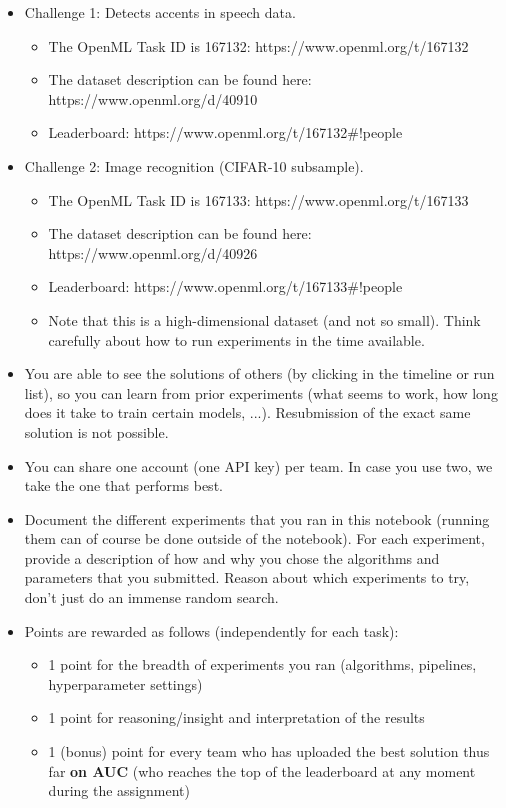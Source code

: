 \documentclass[11pt]{article}
\providecommand{\tightlist}{%
      \setlength{\itemsep}{0pt}\setlength{\parskip}{0pt}}
\begin{document}
\begin{itemize}
\item
  Challenge 1: Detects accents in speech data.

  \begin{itemize}
  \tightlist
  \item
    The OpenML Task ID is 167132: https://www.openml.org/t/167132
  \item
    The dataset description can be found here:
    https://www.openml.org/d/40910
  \item
    Leaderboard: https://www.openml.org/t/167132\#!people
  \end{itemize}
\item
  Challenge 2: Image recognition (CIFAR-10 subsample).

  \begin{itemize}
  \tightlist
  \item
    The OpenML Task ID is 167133: https://www.openml.org/t/167133
  \item
    The dataset description can be found here:
    https://www.openml.org/d/40926
  \item
    Leaderboard: https://www.openml.org/t/167133\#!people
  \item
    Note that this is a high-dimensional dataset (and not so small).
    Think carefully about how to run experiments in the time available.
  \end{itemize}
\item
  You are able to see the solutions of others (by clicking in the
  timeline or run list), so you can learn from prior experiments (what
  seems to work, how long does it take to train certain models, ...).
  Resubmission of the exact same solution is not possible.
\item
  You can share one account (one API key) per team. In case you use two,
  we take the one that performs best.
\item
  Document the different experiments that you ran in this notebook
  (running them can of course be done outside of the notebook). For each
  experiment, provide a description of how and why you chose the
  algorithms and parameters that you submitted. Reason about which
  experiments to try, don't just do an immense random search.
\item
  Points are rewarded as follows (independently for each task):

  \begin{itemize}
  \tightlist
  \item
    1 point for the breadth of experiments you ran (algorithms,
    pipelines, hyperparameter settings)
  \item
    1 point for reasoning/insight and interpretation of the results
  \item
    1 (bonus) point for every team who has uploaded the best solution
    thus far \textbf{on AUC} (who reaches the top of the leaderboard at
    any moment during the assignment)


\end{itemize}
\end{itemize}
\end{document}
